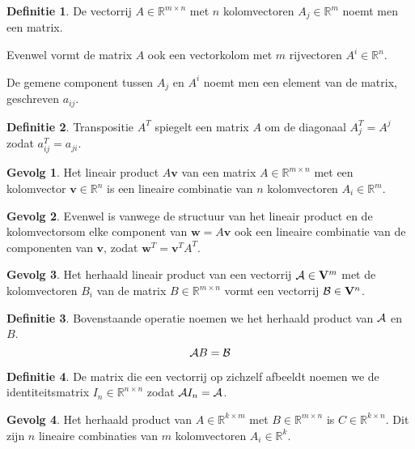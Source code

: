 \documentclass{amsart}
\theoremstyle{definition}
\newtheorem{dfn}{Definitie}[section]
\newtheorem{csq}{Gevolg}[section]
\newcommand{\realnums}{\mathbb{R}}
\newcommand{\realn}[1][n]{\realnums^{#1}}
\newcommand{\realmx}[2][n]{\realn[#2 \times #1]}
\newcommand{\realnxn}{\realmx{n}}
\newcommand{\realmxn}{\realmx{m}}
\newcommand{\vecspace}[1][v]{\mathrm{\mathbf{\MakeUppercase#1}}}
\newcommand{\vecspacen}[1][n]{\vecspace^#1}
\newcommand{\vvec}[1][v]{\mathbf{#1}}
\newcommand{\vecrow}[1][a]{\mathcal{\MakeUppercase{#1}}}
\begin{document}
\begin{dfn}
	De vectorrij $A \in \realn[m \times n]$ met $n$ kolomvectoren $A_{j} \in \realn[m]$ noemt men een matrix.

	Evenwel vormt de matrix $A$ ook een vectorkolom met $m$ rijvectoren $A^i \in \realn$. 

	De gemene component tussen $A_j$ en $A^i$ noemt men een element van de matrix, geschreven $a_{ij}$.
\end{dfn}

\begin{dfn}
	Transpositie $A^T$ spiegelt een matrix $A$ om de diagonaal $A^T_j = A^j$ zodat $a^T_{ij} = a_{ji}$.
\end{dfn}

\begin{csq}
	Het lineair product $A\vvec$ van een matrix $A \in \realmxn$ met een kolomvector $\vvec \in \realn$ is een lineaire combinatie van $n$ kolomvectoren $A_i \in \realn[m]$.
\end{csq}

\begin{csq}
	Evenwel is vanwege de structuur van het lineair product en de kolomvectorsom elke component van $\vvec[w] = A\vvec$ ook een lineaire combinatie van de componenten van $\vvec$, zodat $\vvec[w]^T = \vvec^TA^T$.
\end{csq}

\begin{csq}
	Het herhaald lineair product van een vectorrij $\vecrow \in \vecspacen[m]$ met de kolomvectoren $B_i$ van de matrix $B \in \realmxn$ vormt een vectorrij $\vecrow[b] \in \vecspacen$.
\end{csq}

\begin{dfn}
	Bovenstaande operatie noemen we het herhaald product van $\vecrow$ en $B$.
	\begin{equation*}
		\vecrow B = \vecrow[b]
	\end{equation*}
\end{dfn}

\begin{dfn}
	De matrix die een vectorrij op zichzelf afbeeldt noemen we de identiteitsmatrix $I_n \in \realnxn$ zodat $\vecrow I_n = \vecrow$.
\end{dfn}

\begin{csq}
	Het herhaald product van $A \in \realmx[m]{k}$ met $B \in \realmxn$ is $C \in \realmx[n]{k}$.
	Dit zijn $n$ lineaire combinaties van $m$ kolomvectoren $A_i \in \realn[k]$.
\end{csq}
\end{document}
